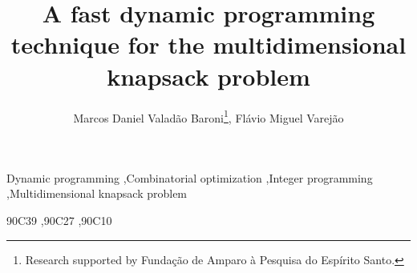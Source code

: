 \documentclass[preprint,12pt]{elsarticle}
\begin{document}
\begin{frontmatter}




\title{A fast dynamic programming technique for the multidimensional knapsack problem}



\address{Universidade Federal do Esp\'irito Santo,\\
}


\author{
   Marcos Daniel Valad\~ao Baroni\thanks{Research supported by Funda\c c\~ao de Amparo \`a Pesquisa do Esp\'irito Santo.},
   Fl\'avio Miguel Varej\~ao
}


\address{}

\begin{abstract}

\end{abstract}

\begin{keyword}
Dynamic programming \sep Combinatorial optimization \sep Integer programming
\sep Multidimensional knapsack problem


\MSC[2010] 90C39 \sep 90C27 \sep 90C10

\end{keyword}

\end{frontmatter}
\end{document}
